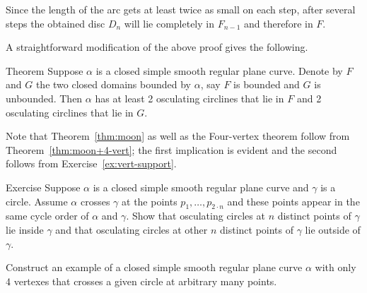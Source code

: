 Since the length of the arc gets at least twice as small on each step, 
after several steps the obtained disc $D_n$ will lie completely in $F_{n-1}$ and therefore in $F$. 
\qeds

A straightforward modification of the above proof gives the following.

\begin{thm}{Theorem}\label{thm:moon+4-vert}
Suppose $\alpha$ is a closed simple smooth regular plane curve.
Denote by $F$ and $G$ the two closed domains bounded by $\alpha$, say $F$ is bounded and $G$ is unbounded.  
Then $\alpha$ has at least 2 osculating circlines that lie in $F$
and  2 osculating circlines that lie in $G$. 
\end{thm}

Note that Theorem~\ref{thm:moon} as well as the Four-vertex theorem \label{thm:4-vert} follow from Theorem~\ref{thm:moon+4-vert};
the first implication is evident and the second follows from Exercise~\ref{ex:vert-support}.


\begin{thm}{Exercise}
Suppose $\alpha$ is a closed simple smooth regular plane curve and $\gamma$ is a circle.
Assume $\alpha$ crosses $\gamma$ at the points $p_1,\dots,p_{2\cdot n}$ and these points appear in the same cycle order of $\alpha$ and $\gamma$.
Show that osculating circles at $n$ distinct points of $\gamma$ lie inside $\gamma$ and that osculating circles at other $n$ distinct points of $\gamma$ lie outside of $\gamma$.

Construct an example of a closed simple smooth regular plane curve $\alpha$ with only 4 vertexes that crosses a given circle at arbitrary many points. 
\end{thm}



